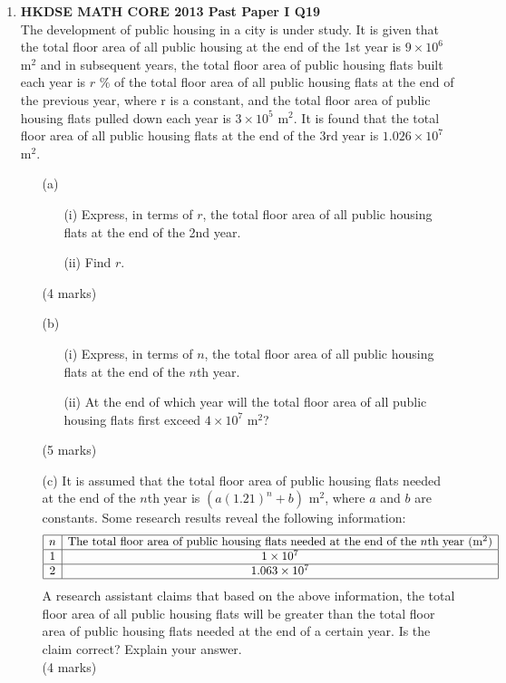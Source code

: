 \documentclass[12pt]{article}
\begin{document}
\begin{enumerate}
	\item \textbf{HKDSE MATH CORE 2013 Past Paper I Q19}\\
	The development of public housing in a city is under study. It is given that the total floor area of all public housing at the end of the 1st year is $9 \times 10^6$ m$^2$ and in subsequent years, the total floor area of public housing flats built each year is $r$ $\%$ of the total floor area of all public housing flats at the end of the previous year, where r is a constant, and the total floor area of public housing flats pulled down each year is $3 \times 10^5$ m$^2$. It is found that the total floor area of all public housing flats at the end of the 3rd year is $1.026 \times 10^7$ m$^2$.
	\begin{enumerate}
		\item[(a)]
		\begin{enumerate}
			\item[(i)] Express, in terms of $r$, the total floor area of all public housing flats at the end of the 2nd year.
			\item[(ii)] Find $r$.
		\end{enumerate}
		(4 marks)
		\item[(b)]
		\begin{enumerate}
			\item[(i)] Express, in terms of $n$, the total floor area of all public housing flats at the end of the $n$th year.
			\item[(ii)] At the end of which year will the total floor area of all public housing flats first exceed $4 \times 10^7$ m$^2$?
		\end{enumerate}
		(5 marks)
		\item[(c)] It is assumed that the total floor area of public housing flats needed at the end of the $n$th year is $(a(1.21)^n + b)$ m$^2$, where $a$ and $b$ are constants. Some research results reveal the following information:
		$$\begin{array}{|c|c|}
			\hline
			n & \text{The total floor area of public housing flats needed at the end of the $n$th year (m$^2$)} \\
			\hline
			1 & 1 \times 10^7\\
			\hline		
			2 & 1.063 \times 10^7\\
			\hline
		\end{array}$$		
		A research assistant claims that based on the above information, the total floor area of all public housing flats will be greater than the total floor area of public housing flats needed at the end of a certain year. Is the claim correct? Explain your answer. \\(4 marks)
	\end{enumerate}
\end{enumerate}
\end{document}

